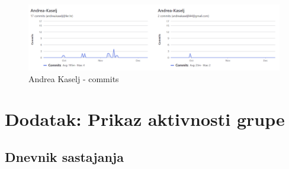     \begin{figure}[H]
            \includegraphics[scale=0.50]{slike/commits_andrea_kaselj.png} %
			
			\centering
			\caption{Andrea Kaselj - commits}
			\label{fig:Andrea Kaselj commits}
			\end{figure}
   
		
	

		
	
			\chapter*{Dodatak: Prikaz aktivnosti grupe}
			
			\section*{Dnevnik sastajanja}
			
